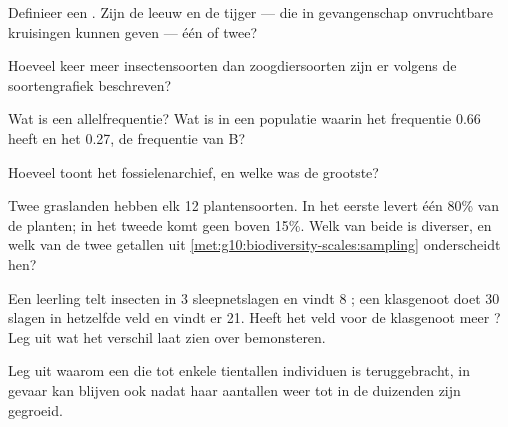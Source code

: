 \begin{exercise}[$\star$]\label{exo:g10:biodiversity-scales:2}
Definieer een . Zijn de leeuw en de tijger --- die in gevangenschap
onvruchtbare kruisingen kunnen geven --- één  of twee?
\end{exercise}

\begin{exercise}[$\star$]\label{exo:g10:biodiversity-scales:3}
Hoeveel keer meer insectensoorten dan zoogdiersoorten zijn er volgens de
soortengrafiek beschreven?
\end{exercise}

\begin{exercise}[$\star$]\label{exo:g10:biodiversity-scales:4}
Wat is een allelfrequentie? Wat is in een populatie waarin het 
frequentie 0.66 heeft en het  0.27, de frequentie van B?
\end{exercise}

\begin{exercise}[$\star$]\label{exo:g10:biodiversity-scales:5}
Hoeveel  toont het fossielenarchief, en welke was de
grootste?
\end{exercise}

\begin{exercise}[$\star\star$]\label{exo:g10:biodiversity-scales:6}
Twee graslanden hebben elk 12 plantensoorten. In het eerste levert één
 80\% van de planten; in het tweede komt geen  boven 15\%.
Welk van beide is diverser, en welk van de twee getallen uit
\cref{met:g10:biodiversity-scales:sampling} onderscheidt hen?
\end{exercise}

\begin{exercise}[$\star\star$]\label{exo:g10:biodiversity-scales:7}
Een leerling telt insecten in 3 sleepnetslagen en vindt 8 ; een
klasgenoot doet 30 slagen in hetzelfde veld en vindt er 21. Heeft het
veld voor de klasgenoot meer ? Leg uit wat het verschil laat zien
over bemonsteren.
\end{exercise}

\begin{exercise}[$\star\star$]\label{exo:g10:biodiversity-scales:8}
Leg uit waarom een  die tot enkele tientallen individuen is
teruggebracht, in gevaar kan blijven ook nadat haar aantallen weer tot
in de duizenden zijn gegroeid.
\end{exercise}

